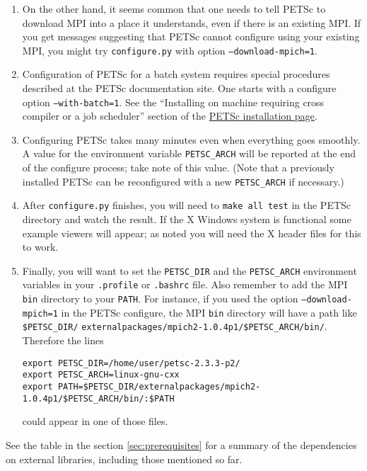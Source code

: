\documentclass[11pt,final]{amsart}
\begin{document}
\begin{enumerate}
\begin{enumerate}
\item On the other hand, it seems common that one needs to tell PETSc to download MPI into a place it understands, even if there is an existing MPI.  If you get messages suggesting that PETSc cannot configure using your existing MPI, you might try \texttt{configure.py} with option \texttt{--download-mpich=1}.

\item Configuration of PETSc for a batch system requires special procedures described at the PETSc documentation site.  One starts with a configure option \texttt{--with-batch=1}.  See the ``Installing on machine requiring cross compiler or a job scheduler'' section of the \href{http://www-unix.mcs.anl.gov/petsc/petsc-2/documentation/installation.html}{PETSc installation page}.

\item  Configuring PETSc takes many minutes even when everything goes smoothly.   A value for the environment variable \texttt{PETSC_ARCH} will be reported at the end of the configure process; take note of this value.  (Note that a previously installed PETSc can be reconfigured with a new \texttt{PETSC_ARCH} if necessary.)

\item  After \texttt{configure.py} finishes, you will need to \texttt{make all test} in the PETSc directory and watch the result.  If the X Windows system is functional some example viewers will appear; as noted you will need the X header files for this to work.

\item Finally, you will want to set the \texttt{PETSC_DIR} and the \texttt{PETSC_ARCH} environment variables in your \texttt{.profile} or \texttt{.bashrc} file.  Also remember to add the MPI \texttt{bin} directory to your \texttt{PATH}.  For instance, if you used the option \texttt{--download-mpich=1} in the PETSc configure, the MPI \texttt{bin} directory will have a path like \texttt{\$PETSC_DIR/} \texttt{externalpackages/mpich2-1.0.4p1/\$PETSC_ARCH/bin/}.  Therefore the lines 
\begin{verbatim}
export PETSC_DIR=/home/user/petsc-2.3.3-p2/
export PETSC_ARCH=linux-gnu-cxx
export PATH=$PETSC_DIR/externalpackages/mpich2-1.0.4p1/$PETSC_ARCH/bin/:$PATH
\end{verbatim}
\noindent could appear in one of those files.
\end{enumerate}
\end{enumerate}
\medskip See the table in the section \ref{sec:prerequisites} for a summary of the dependencies on external libraries, including
those mentioned so far.
\end{document}
